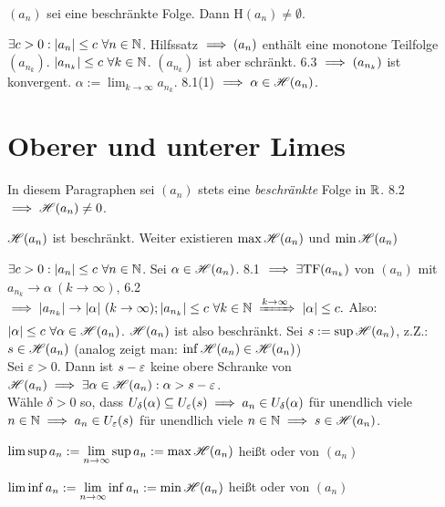 \documentclass[a4paper,oneside,DIV15,BCOR12mm]{scrbook}
\begin{document}
\begin{satz}
$(a_n)$ sei eine beschränkte Folge. Dann H$(a_n) \ne \emptyset$.
\end{satz}

\begin{beweis}
$\exists c>0: |a_n| \le c \ \forall n\in\mathbb{N}$. Hilfssatz $\implies (a_n)$ enthält eine monotone Teilfolge $(a_{n_k})$. $|a_{n_k}| \le c \ \forall k \in\mathbb{N}$. $(a_{n_k})$ ist aber schränkt. 6.3 $\implies (a_{n_k})$ ist konvergent. $\alpha := \lim_{k\to\infty}a_{n_k}$. 8.1(1) $\implies \alpha \in \mathscr{H}(a_n)$. 
\end{beweis}

\chapter{Oberer und unterer Limes}

\begin{vereinbarung}
In diesem Paragraphen sei $(a_n)$ stets eine \textit{beschränkte} Folge in $\mathbb{R}$. 8.2 $\implies \mathscr{H}(a_n) \ne 0$.
\end{vereinbarung}

\begin{satz}
$\mathscr{H}(a_n)$ ist beschränkt. Weiter existieren $\max \mathscr{H}(a_n)$ und $\min \mathscr{H}(a_n)$
\end{satz}
\begin{beweis}
$\exists c>0: |a_n| \le c \ \forall n\in\mathbb{N}$. Sei $\alpha \in \mathscr{H}(a_n)$. 8.1 $\implies \exists \text{TF}(a_{n_k})$ von $(a_n)$ mit $a_{n_k} \to \alpha\ (k\to\infty)$, 6.2 $\folgt |a_{n_k}| \to |\alpha| \ (k\to\infty); |a_{n_k}| \le c \ \forall k \in\MdN \folgtwegen{k\to\infty} |\alpha| \le c.$
Also: $|\alpha| \le c  \ \forall \alpha \in \mathscr{H}(a_n)$. $\mathscr{H}(a_n)$ ist also beschränkt. Sei $s:=\sup\mathscr{H}(a_n)$, z.Z.: $s\in\mathscr{H}(a_n)$ (analog zeigt man: $\inf\mathscr{H}(a_n) \in \mathscr{H}(a_n)$) \\
Sei $\varepsilon > 0$. Dann ist $s-\varepsilon$ keine obere Schranke von $\mathscr{H}(a_n) \implies \exists \alpha \in \mathscr{H}(a_n): \alpha > s - \varepsilon$.\\
Wähle $\delta > 0$ so, dass $U_\delta(\alpha) \subseteq U_\varepsilon(s) \implies a_n \in U_\delta(\alpha)$ für unendlich viele $n\in\mathbb{N} \implies a_n\in U_\varepsilon(s)$ für unendlich viele $n\in\mathbb{N} \implies s \in \mathscr{H}(a_n)$.
\end{beweis}

\begin{definition}
$\displaystyle\limsup a_n := \lim_{n\to\infty}\sup a_n := \max\mathscr{H}(a_n)$ heißt  oder  von $(a_n)$

$\displaystyle\liminf a_n := \lim_{n\to\infty}\inf a_n := \min\mathscr{H}(a_n)$ heißt  oder  von $(a_n)$
\end{definition}
\end{document}
